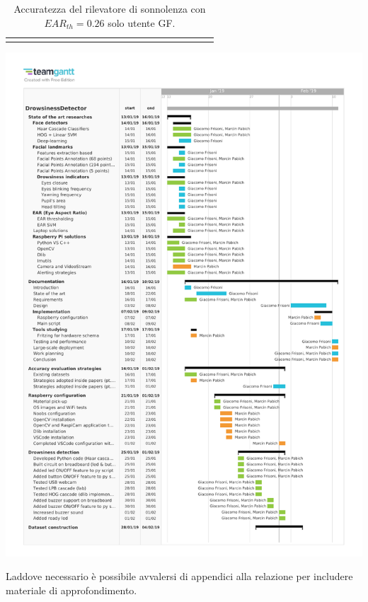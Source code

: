 \documentclass[12pt]{article}
\begin{document}
\begin{landscape}
\begin{table}[]
\begin{adjustbox}{width=1.4\textwidth}
\begin{tabular}{lllllllllllllllccllll}
				& & & & & & & & & & & & & & & \multicolumn{1}{l}{} & \multicolumn{1}{l}{} & & & &
			\end{tabular}
		\end{adjustbox}
		\caption{Accuratezza del rilevatore di sonnolenza con $EAR_{th}=0.26$ solo utente GF.}
		\label{table:gf_ear_26}
	\end{table}
\end{landscape}



\thispagestyle{empty}
{
	\centering
	\includegraphics[page=2,scale=.95]{pdf/drowsiness_detector_gantt.pdf}
	\label{fig:gantt}
	\par
}

\restoregeometry

\iffalse
Laddove necessario è possibile avvalersi di appendici alla relazione per includere materiale di approfondimento.\\
\end{document}
